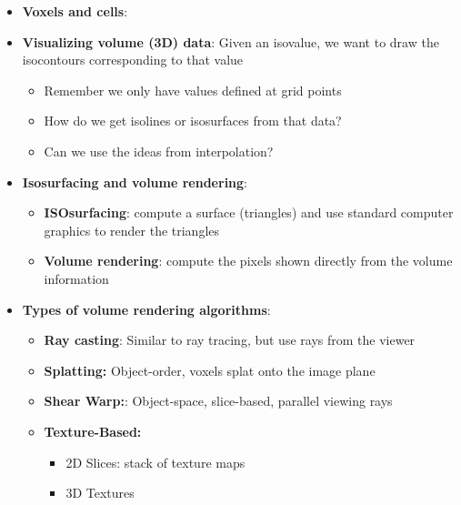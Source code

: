 \documentclass{report}
\begin{document}
\begin{itemize}
            \bigbreak \noindent 
            An isosurface is a three-dimensional analog of an isoline. It is a surface that represents points of a constant value (e.g. pressure, temperature, velocity, density) within a volume of space; in other words, it is a level set of a continuous function whose domain is 3-space.
            \bigbreak \noindent 
            That constant value is called an \textbf{isovalue}.
        \item \textbf{Voxels and cells}: 
            \bigbreak \noindent 
        \item \textbf{Visualizing volume (3D) data}: 
            \bigbreak \noindent 
            \bigbreak \noindent 
            Given an isovalue, we want to draw the isocontours corresponding to that value
            \begin{itemize}
                \item Remember we only have values defined at grid points
                \item How do we get isolines or isosurfaces from that data?
                \item Can we use the ideas from interpolation?
            \end{itemize}
        \item \textbf{Isosurfacing and volume rendering}: 
            \begin{itemize}
                \item \textbf{ISOsurfacing}: compute a surface (triangles) and use standard computer graphics to render the triangles
                \item \textbf{Volume rendering}: compute the pixels shown directly from the volume information
            \end{itemize}
        \item \textbf{Types of volume rendering algorithms}: 
            \begin{itemize}
                \item \textbf{Ray casting}: Similar to ray tracing, but use rays from the viewer
                \item \textbf{Splatting:} Object-order, voxels splat onto the image plane
                \item \textbf{Shear Warp:}: Object-space, slice-based, parallel viewing rays
                \item \textbf{Texture-Based:}
                    \begin{itemize}
                        \item 2D Slices: stack of texture maps
                        \item 3D Textures
                    \end{itemize}
            \end{itemize}



    \end{itemize}
\end{document}
